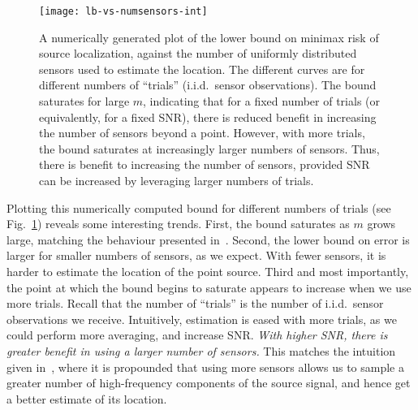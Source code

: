 \documentclass[conference]{IEEEtran}
\begin{document}
\begin{figure}[t]
	\centering
	\texttt{[image: lb-vs-numsensors-int]}
	\caption{A numerically generated plot of the lower bound on minimax risk of
	source localization, against the number of uniformly distributed sensors
used to estimate the location. The different curves are for different numbers
of ``trials'' (i.i.d.\ sensor observations). The bound saturates for large $m$,
indicating that for a fixed number of trials (or equivalently, for a fixed
SNR), there is reduced benefit in increasing the number of sensors beyond a
point. However, with more trials, the bound saturates at increasingly larger
numbers of sensors. Thus, there is benefit to increasing the number of sensors,
provided SNR can be increased by leveraging larger numbers of trials.}
	\label{fig:numerical}
\end{figure}

Plotting this numerically computed bound for different numbers of trials (see
Fig.~\ref{fig:numerical}) reveals some interesting trends. First, the bound
saturates as $m$ grows large, matching the behaviour presented
in~\cite{Grover2016Fundamental}. Second, the lower bound on error is larger for
smaller numbers of sensors, as we expect. With fewer sensors, it is harder to
estimate the location of the point source. Third and most importantly, the
point at which the bound begins to saturate appears to increase when we use
more trials. Recall that the number of ``trials'' is the number of i.i.d.\
sensor observations we receive. Intuitively, estimation is eased with more
trials, as we could perform more averaging, and increase SNR. \emph{With higher
SNR, there is greater benefit in using a larger number of sensors.} This
matches the intuition given in~\cite{Grover2016Information}, where it is
propounded that using more sensors allows us to sample a greater number of
high-frequency components of the source signal, and hence get a better estimate
of its location.



\end{document}
